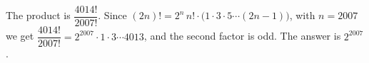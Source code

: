 The product is $\dfrac{4014!}{2007!}$. Since $(2n)!=2^n\,n!\cdot\big(1\cdot3\cdot5\cdots(2n-1)\big)$, with $n=2007$ we get $\dfrac{4014!}{2007!}=2^{2007}\cdot1\cdot3\cdots4013$, and the second factor is odd. The answer is $\boxed{2^{2007}}$.
